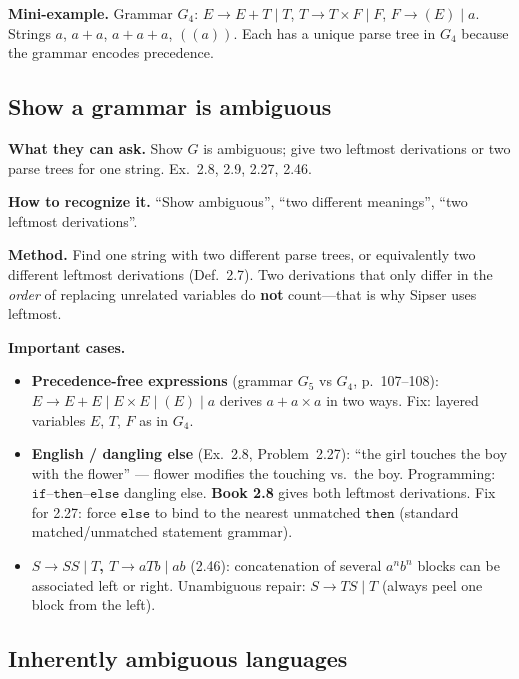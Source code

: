 \documentclass[11pt,a4paper]{article}
\begin{document}
\textbf{Mini-example.}
Grammar $G_4$: $E\to E+T\mid T$, $T\to T\times F\mid F$,
$F\to(E)\mid a$. Strings $a$, $a+a$, $a+a+a$, $((a))$. Each has a
unique parse tree in $G_4$ because the grammar encodes precedence.

\subsection{Show a grammar is ambiguous}

\textbf{What they can ask.}
Show $G$ is ambiguous; give two leftmost derivations or two parse
trees for one string. Ex.~2.8, 2.9, 2.27, 2.46.

\textbf{How to recognize it.}
``Show ambiguous'', ``two different meanings'', ``two leftmost
derivations''.

\textbf{Method.}
Find one string with two different parse trees, or equivalently two
different leftmost derivations (Def.~2.7). Two derivations that only
differ in the \emph{order} of replacing unrelated variables do
\textbf{not} count---that is why Sipser uses leftmost.

\textbf{Important cases.}
\begin{itemize}
  \item \textbf{Precedence-free expressions} (grammar $G_5$ vs $G_4$,
        p.~107--108): $E\to E+E\mid E\times E\mid(E)\mid a$ derives
        $a+a\times a$ in two ways. Fix: layered variables $E$, $T$,
        $F$ as in $G_4$.
  \item \textbf{English / dangling else} (Ex.~2.8, Problem~2.27):
        ``the girl touches the boy with the flower'' --- flower
        modifies the touching vs.\ the boy. Programming:
        $\mathtt{if}$--$\mathtt{then}$--$\mathtt{else}$ dangling else.
        \textbf{Book 2.8} gives both leftmost derivations.
        Fix for 2.27: force $\mathtt{else}$ to bind to the nearest
        unmatched $\mathtt{then}$ (standard matched/unmatched
        statement grammar).
  \item \textbf{$S\to SS\mid T$, $T\to aTb\mid ab$} (2.46):
        concatenation of several $a^nb^n$ blocks can be associated
        left or right. Unambiguous repair: $S\to TS\mid T$ (always
        peel one block from the left).
\end{itemize}

\subsection{Inherently ambiguous languages}
\end{document}
